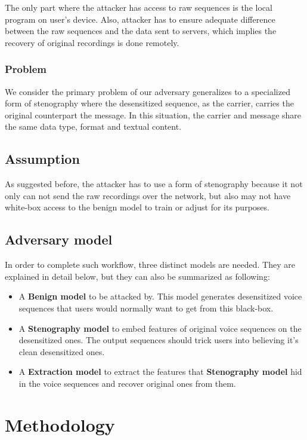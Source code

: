 \documentclass[journal]{IEEEtran} %
\begin{document}
\begin{CJK*}{UTF8}{gbsn}
The only part where the attacker has access to raw sequences is the local program on user's device. Also, attacker has to ensure adequate difference between the raw sequences and the data sent to servers, which implies the recovery of original recordings is done remotely.

\subsubsection{Problem}

We consider the primary problem of our adversary generalizes to a specialized form of stenography where the desensitized sequence, as the carrier, carries the original counterpart the message. In this situation, the carrier and message share the same data type, format and textual content.

\subsection{Assumption}

As suggested before, the attacker has to use a form of stenography because it not only can not send the raw recordings over the network, but also may not have white-box access to the benign model to train or adjust for its purposes.

\subsection{Adversary model}

In order to complete such workflow, three distinct models are needed. They are explained in detail below, but they can also be summarized as following:

\begin{itemize}
    \item A \textbf{Benign model} to be attacked by. This model generates desensitized voice sequences that users would normally want to get from this black-box.
    \item A \textbf{Stenography model} to embed features of original voice sequences on the desensitized ones. The output sequences should trick users into believing it's clean desensitized ones.
    \item A \textbf{Extraction model} to extract the features that \textbf{Stenography model} hid in the voice sequences and recover original ones from them.
\end{itemize}

\section{Methodology}


\end{CJK*}
\end{document}
